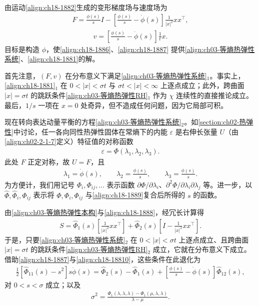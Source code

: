 \documentclass[../../main.tex]{subfiles}
\begin{document}
由运动\eqref{align:ch18-1882}生成的变形梯度场与速度场为
\begin{align}
F=\frac{\phi(s)}{s}I-\left[\frac{\phi(s)}{s}-\dot\phi(s)\right]\frac{1}{|x|^2}xx^\top,
\label{align:ch18-1886}
\end{align}
\begin{align}
v=\left[\frac{\phi(s)}{s}-\dot\phi(s)\right]\frac1t x.
\label{align:ch18-1887}
\end{align}
目标是构造 $\phi$，使\eqref{align:ch18-1886}、\eqref{align:ch18-1887} 提供\eqref{align:ch03-等熵热弹性系统}、\eqref{align:ch18-1881}的解。

首先注意，$(F,v)$ 在分布意义下满足\eqref{align:ch03-等熵热弹性系统}$_1$。事实上，\eqref{align:ch18-1881}$_1$ 在 $0<|x|<\sigma t$ 与 $\sigma t<|x|<\infty$ 上逐点成立；此外，跨曲面 $|x|=\sigma t$ 的跳跃条件\eqref{align:ch03-等熵热弹性RH}$_1$ 作为 $\chi$ 连续性的直接推论成立。最后，$1/s$ 一项在 $x=0$ 处奇异，但不造成任何问题，因为它局部可积。

现在转向表达动量平衡的方程\eqref{align:ch03-等熵热弹性系统}$_2$。如\cref{section:ch02-热弹性}中讨论，任一各向同性热弹性固体在常熵下的内能 $\varepsilon$ 是右伸长张量 $U$（由\eqref{align:ch02-2-1-7}定义）特征值的对称函数
\begin{align}
\varepsilon=\Phi(\lambda_1,\lambda_2,\lambda_3).
\label{align:ch18-1888}
\end{align}
此处 $F$ 正定对称，故 $U=F$，且
\begin{align}
\lambda_1=\dot\phi(s),\qquad \lambda_2=\frac{\phi(s)}{s},\qquad \lambda_3=\frac{\phi(s)}{s}.
\label{align:ch18-1889}
\end{align}
为方便计，我们用记号 $\Phi_i,\Phi_{ij},\ldots$ 表示函数 $\partial\Phi/\partial\lambda_i$、$\partial^2\Phi/\partial\lambda_i\partial\lambda_j$ 等。进一步，以 $\hat\Phi,\hat\Phi_i,\hat\Phi_{ij}$ 表示将 $\Phi,\Phi_i,\Phi_{ij}$ 与\eqref{align:ch18-1889}复合后所得的 $s$ 的函数。

由\eqref{align:ch03-等熵热弹性本构}与\eqref{align:ch18-1888}，经冗长计算得
\begin{align}
S=\hat\Phi_1(s)\left[\frac{1}{|x|^2}xx^\top\right]+\hat\Phi_2(s)\left[I-\frac{1}{|x|^2}xx^\top\right].
\label{align:ch18-18810}
\end{align}
于是，只要\eqref{align:ch03-等熵热弹性系统}$_2$ 在 $0<|x|<\sigma t$ 上逐点成立、且跨曲面 $|x|=\sigma t$ 的跳跃条件\eqref{align:ch03-等熵热弹性RH}$_2$ 成立，它就在分布意义下成立。借助\eqref{align:ch18-1887}与\eqref{align:ch18-18810}，这些条件在此退化为
\begin{align}
\frac12\left[\hat\Phi_{11}(s)-s^2\right]s\ddot\phi(s)=\hat\Phi_2(s)-\hat\Phi_1(s)
+\left[\frac{\phi(s)}{s}-\dot\phi(s)\right]\hat\Phi_{12}(s),
\label{align:ch18-18811}
\end{align}
对 $0<s<\sigma$ 成立；以及
\begin{align}
\sigma^2=\frac{\Phi_1(\lambda,\lambda,\lambda)-\Phi_1(\mu,\lambda,\lambda)}{\lambda-\mu}.
\label{align:ch18-18812}
\end{align}
\end{document}
